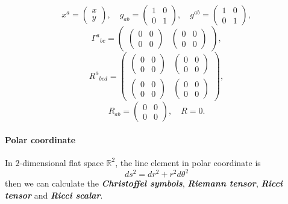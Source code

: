 \documentclass[11pt]{article}
\let\mathbbalt\mathbb
\let\mathbb\mathbbalt
\begin{document}
    $$x^{a}=\begin{pmatrix}x\\y\end{pmatrix},\quad g_{ab}=\begin{pmatrix} 1 & 0\\ 0 & 1 \end{pmatrix},\quad g^{ab}=\begin{pmatrix} 1 & 0\\ 0 & 1 \end{pmatrix},$$
$${\Gamma^{a}}_{bc}=\begin{pmatrix} \begin{pmatrix} 0 & 0\\ 0 & 0 \end{pmatrix} & \begin{pmatrix} 0 & 0\\ 0 & 0 \end{pmatrix} \end{pmatrix},$$
$${R^{a}}_{bcd}=\begin{pmatrix} \begin{pmatrix} 0 & 0\\ 0 & 0 \end{pmatrix} & \begin{pmatrix} 0 & 0\\ 0 & 0 \end{pmatrix}\\ \begin{pmatrix} 0 & 0\\ 0 & 0 \end{pmatrix} & \begin{pmatrix} 0 & 0\\ 0 & 0 \end{pmatrix} \end{pmatrix},$$
$$R_{ab}=\begin{pmatrix} 0 & 0\\ 0 & 0 \end{pmatrix},\quad R=0.$$

    \hypertarget{polar-coordinate}{%
\paragraph{Polar coordinate}\label{polar-coordinate}}

In \(2\)-dimensional flat space \(\mathbb{R}^2\), the line element in
polar coordinate is \[
ds^2 = dr^2 + r^2d\theta^2
\] then we can calculate the \textbf{\emph{Christoffel symbols}},
\textbf{\emph{Riemann tensor}}, \textbf{\emph{Ricci tensor}} and
\textbf{\emph{Ricci scalar}}.
\end{document}
